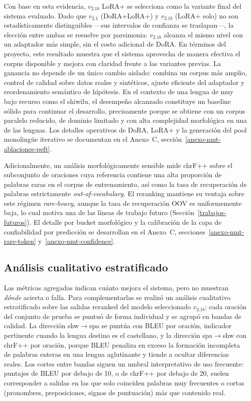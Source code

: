 \documentclass[12pt,a4paper,oneside]{book}
\begin{document}
Con base en esta evidencia, \(v_{2.1b}\) LoRA+ se selecciona como la variante final del sistema evaluado. Dado que \(v_{2.1}\) (DoRA+LoRA+) y \(v_{2.1b}\) (LoRA+ solo) no son estadísticamente distinguibles —sus intervalos de confianza se traslapan—, la elección entre ambas se resuelve por parsimonia: \(v_{2.1b}\) alcanza el mismo nivel con un adaptador más simple, sin el costo adicional de DoRA. En términos del proyecto, este resultado muestra que el sistema aprovecha de manera efectiva el corpus disponible y mejora con claridad frente a las variantes previas. La ganancia no depende de un único cambio aislado: combina un corpus más amplio, control de calidad sobre datos reales y sintéticos, ajuste eficiente del adaptador y reordenamiento semántico de hipótesis. En el contexto de una lengua de muy bajo recurso como el shiwilu, el desempeño alcanzado constituye un baseline sólido para continuar el desarrollo, precisamente porque se obtiene con un corpus paralelo reducido, de dominio limitado y con alta complejidad morfológica en una de las lenguas. Los detalles operativos de DoRA, LoRA+ y la generación del pool monolingüe iterativo se documentan en el Anexo~C, sección~\ref{anexo-nmt-ablaciones-peft}.

Adicionalmente, un análisis morfológicamente sensible mide chrF++ sobre el subconjunto de oraciones cuya referencia contiene una alta proporción de palabras raras en el corpus de entrenamiento, así como la tasa de recuperación de palabras estrictamente \emph{out-of-vocabulary}. El reranking mantiene su ventaja sobre este régimen \emph{rare-heavy}, aunque la tasa de recuperación OOV es uniformemente baja, lo cual motiva una de las líneas de trabajo futuro (Sección~\ref{trabajos-futuros}). El detalle por bucket morfológico y la calibración de la capa de confiabilidad por predicción se desarrollan en el Anexo~C, secciones~\ref{anexo-nmt-rare-token} y~\ref{anexo-nmt-confidence}.

\subsection{Análisis cualitativo estratificado}\label{nmt-cualitativo}

Las métricas agregadas indican cuánto mejora el sistema, pero no muestran \emph{dónde} acierta o falla. Para complementarlas se realizó un análisis cualitativo estratificado sobre las salidas reranked del modelo seleccionado \(v_{2.1b}\): cada oración del conjunto de prueba se puntuó de forma individual y se agrupó en bandas de calidad. La dirección shw\(\rightarrow\)spa se puntúa con BLEU por oración, indicador pertinente cuando la lengua destino es el castellano, y la dirección spa\(\rightarrow\)shw con chrF++ por oración, porque BLEU penaliza en exceso la formación incompleta de palabras enteras en una lengua aglutinante y tiende a ocultar diferencias reales. Los cortes entre bandas siguen un umbral interpretativo de uso frecuente: puntajes de BLEU por debajo de 10, o de chrF++ por debajo de 20, suelen corresponder a salidas en las que solo coinciden palabras muy frecuentes o cortas (pronombres, preposiciones, signos de puntuación) más que contenido real.
\end{document}
